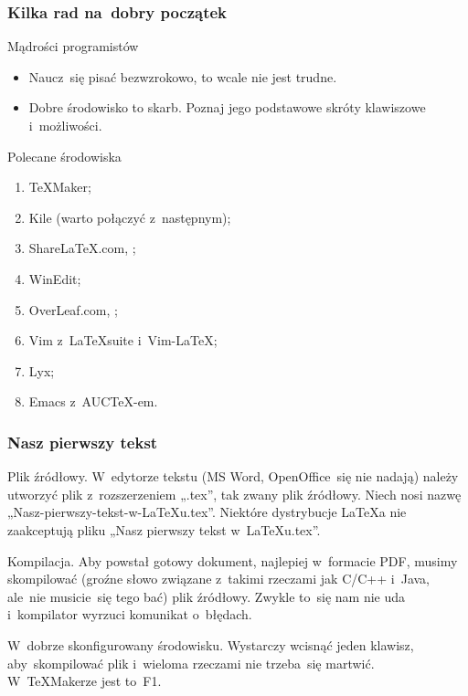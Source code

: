 \documentclass[10pt,t]{beamer}
\begin{document}
\begin{frame}
  \frametitle{Kilka rad na~dobry początek}


  Mądrości programistów
  \begin{itemize}
    \RaggedRight

  \item Naucz~się pisać bezwzrokowo, to wcale nie jest trudne.

  \item Dobre środowisko to skarb. Poznaj jego podstawowe skróty
    klawiszowe i~możliwości.

  \end{itemize}

  Polecane środowiska
  \begin{enumerate}
    \RaggedRight

  \item \TeX Maker;

  \item Kile (warto połączyć z~następnym);

  \item Share\LaTeX.com,
    ;

  \item WinEdit;

  \item OverLeaf.com,
    ;

  \item Vim z~\LaTeX suite i~Vim-\LaTeX;

  \item Lyx;

  \item Emacs z~AUC\TeX-em.

  \end{enumerate}

\end{frame}





\begin{frame}[fragile]
  \frametitle{Nasz pierwszy tekst}


  Plik źródłowy.
  W~edytorze tekstu (MS Word, OpenOffice~się nie nadają) należy
  utworzyć plik z~rozszerzeniem „.tex”, tak zwany plik źródłowy.
  Niech nosi nazwę „Nasz-pierwszy-tekst-w-LaTeXu.tex”. Niektóre
  dystrybucje \LaTeX a nie zaakceptują pliku „Nasz pierwszy tekst
  w~LaTeXu.tex”.

  Kompilacja.
  Aby powstał gotowy dokument, najlepiej w~formacie PDF, musimy
  skompilować (groźne słowo związane z~takimi rzeczami jak C/C++
  i~Java, ale~nie musicie~się tego bać) plik źródłowy. Zwykle to~się
  nam nie uda i~kompilator wyrzuci komunikat o~błędach.

  W~dobrze skonfigurowany środowisku.
  Wystarczy wcisnąć jeden klawisz, aby~skompilować plik i~wieloma
  rzeczami nie trzeba~się martwić. W~\TeX Makerze jest to~F1.

\end{frame}
\end{document}
